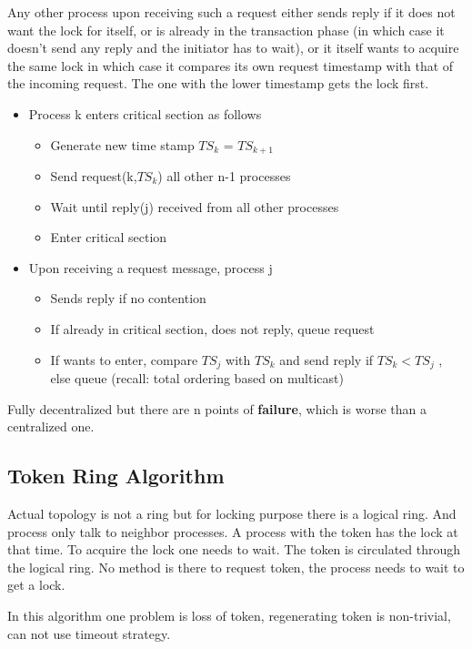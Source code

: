 \documentclass[twoside]{article}
\begin{document}
Any other process upon receiving such a request either sends reply if it does not want the lock for itself, or is already in the transaction phase (in which case it doesn't send any reply and the initiator has to wait), or it itself wants to acquire the same lock in which case it compares its own request timestamp with that of the incoming request. The one with the lower timestamp gets the lock first.

\begin{itemize}
\item Process k enters critical section as follows
  \begin{itemize}
    \item Generate new time stamp $TS_k$ = $TS_{k+1}$
    \item Send request(k,$TS_k$) all other n-1 processes
    \item Wait until reply(j) received from all other processes
    \item Enter critical section
  \end{itemize}
\item Upon receiving a request message, process j
  \begin{itemize}
    \item Sends reply if no contention
    \item If already in critical section, does not reply, queue request
    \item If wants to enter, compare $TS_j$ with $TS_k$ and send reply if $TS_k<TS_j$ , else queue (recall: total ordering based on multicast)
  \end{itemize}
\end{itemize}

Fully decentralized but there are n points of \textbf{failure}, which is worse than a centralized one.

\subsection{Token Ring Algorithm}
Actual topology is not a ring but for locking purpose there is a logical ring. And process only talk to neighbor processes. A process with the token has the lock at that time. To acquire the lock one needs to wait. The token is circulated through the logical ring. No method is there to request token, the process needs to wait to get a lock.

In this algorithm one problem is loss of token, regenerating token is non-trivial, can not use timeout strategy. 
\end{document}
